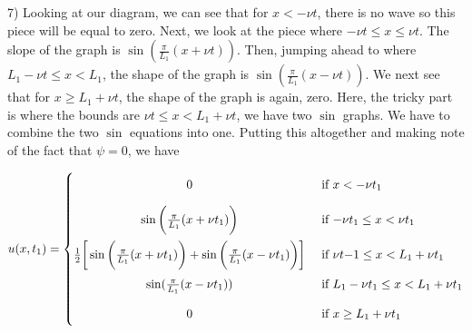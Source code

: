\documentclass[executivepaper]{article}
\begin{document}
\begin{flushleft}

7) Looking at our diagram, we can see that for $x < -\nu t$, there is no wave so this piece will be equal to zero. Next, we look at the piece where $-\nu t \leq x \leq \nu t$. The slope of the graph is $\sin(\frac{\pi}{L_{1}} (x+\nu t))$. Then, jumping ahead to where $L_{1}-\nu t \leq x < L_{1}$, the shape of the graph is $\sin(\frac{\pi}{L_{1}} (x-\nu t))$. We next see that for $x \geq L_{1}+\nu t$, the shape of the graph is again, zero. Here, the tricky part is where the bounds are $\nu t \leq x < L_{1}+\nu t$, we have two $\sin$ graphs. We have to combine the two $\sin$ equations into one. Putting this altogether and making note of the fact that $\psi=0$, we have

\begin{center}

\[
 u(x,t_{1})=
  \begin{cases}
      \hfill 0  \hfill & \text{ if $x < -\nu t_{1}$} \\[1em]
      
      \hfill \sin\bigg(\frac{\pi}{L_{1}} (x+\nu t_{1})\bigg) \hfill & \text{ if $-\nu t_{1} \leq x < \nu t_{1}$} \\[1em]
      
      \hfill \frac{1}{2} \bigg[\sin\bigg(\frac{\pi}{L_{1}} (x+\nu t_{1})\bigg)+\sin\bigg(\frac{\pi}{L_{1}} (x-\nu t_{1})\bigg)\bigg] \hfill & \text{ if $\nu t{-1} \leq x < L_{1}+\nu t_{1}$} \\[1em]
      
      \hfill \sin(\frac{\pi}{L_{1}} (x-\nu t_{1})) \hfill & \text{ if $L_{1}-\nu t_{1} \leq x < L_{1}+\nu t_{1}$} \\[1em]
      
      \hfill 0 \hfill & \text{ if $x \geq L_{1}+\nu t_{1}$}
  \end{cases}
\]

\end{center}

\end{flushleft}
\end{document}
